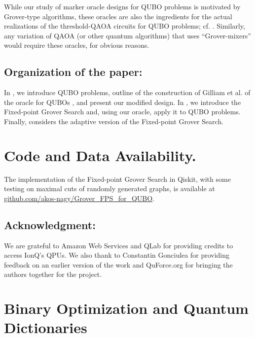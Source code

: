 \documentclass[reqno, 12pt]{amsart}
\numberwithin{equation}{section}                %
\begin{document}
\smallskip

While our study of marker oracle designs for QUBO problems is motivated by Grover-type algorithms, these oracles are also the ingredients for the actual realizations of the threshold-QAOA circuits for QUBO problems; cf. \cite{golden_threshold_2021}. Similarly, any variation of QAOA (or other quantum algorithms) that uses ``Grover-mixers'' would require these oracles, for obvious reasons.

\medskip

\subsection*{Organization of the paper:} In , we introduce QUBO problems, outline of the construction of Gilliam et al. of the oracle for QUBOs \cite{gilliam_grover_2021}, and present our modified design. In , we introduce the Fixed-point Grover Search and, using our oracle, apply it to QUBO problems. Finally,  considers the adaptive version of the Fixed-point Grover Search.

\smallskip

\section*{Code and Data Availability.} The implementation of the Fixed-point Grover Search in Qiskit, with some testing on maximal cuts of randomly generated graphs, is available at \href{https://github.com/akos-nagy/Grover_FPS_for_QUBO}{github.com/akos-nagy/Grover\_FPS\_for\_QUBO}.

\smallskip

\subsection*{Acknowledgment:} We are grateful to Amazon Web Services and QLab for providing credits to access IonQ's QPUs. We also thank to Constantin Gonciulea for providing feedback on an earlier version of the work and QuForce.org for bringing the authors together for the project.

\bigskip

\section{Binary Optimization and Quantum Dictionaries}
\label{sec:qubos_and_qdicts}
\end{document}
